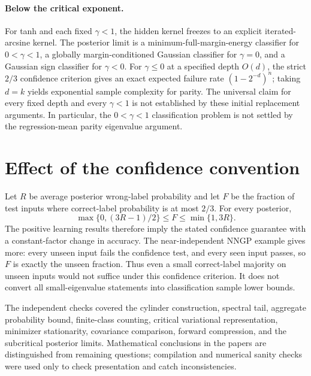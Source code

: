 \documentclass[11pt]{article}
\begin{document}
\paragraph{Below the critical exponent.}
For tanh and each fixed $\gamma<1$, the hidden kernel freezes to an explicit iterated-arcsine kernel. The posterior limit is a minimum-full-margin-energy classifier for $0<\gamma<1$, a globally margin-conditioned Gaussian classifier for $\gamma=0$, and a Gaussian sign classifier for $\gamma<0$. For $\gamma\leq0$ at a specified depth $O(d)$, the strict $2/3$ confidence criterion gives an exact expected failure rate $(1-2^{-d})^n$; taking $d=k$ yields exponential sample complexity for parity. The universal claim for every fixed depth and every $\gamma<1$ is not established by these initial replacement arguments. In particular, the $0<\gamma<1$ classification problem is not settled by the regression-mean parity eigenvalue argument.

\section{Effect of the confidence convention}
Let $R$ be average posterior wrong-label probability and let $F$ be the fraction of test inputs where correct-label probability is at most $2/3$. For every posterior,
\[
 \max\{0,(3R-1)/2\}\leq F\leq\min\{1,3R\}.
\]
The positive learning results therefore imply the stated confidence guarantee with a constant-factor change in accuracy. The near-independent NNGP example gives more: every unseen input fails the confidence test, and every seen input passes, so $F$ is exactly the unseen fraction. Thus even a small correct-label majority on unseen inputs would not suffice under this confidence criterion. It does not convert all small-eigenvalue statements into classification sample lower bounds.

The independent checks covered the cylinder construction, spectral tail, aggregate probability bound, finite-class counting, critical variational representation, minimizer stationarity, covariance comparison, forward compression, and the subcritical posterior limits. Mathematical conclusions in the papers are distinguished from remaining questions; compilation and numerical sanity checks were used only to check presentation and catch inconsistencies.
\end{document}
